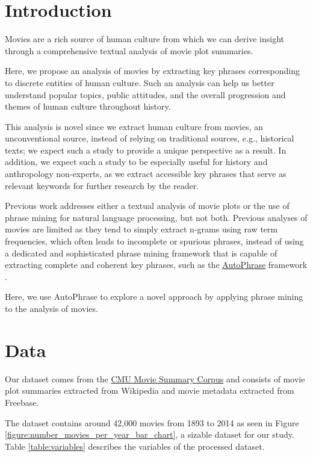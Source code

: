 \documentclass{article}
\begin{document}
\begin{multicols}{2}
\section{Introduction} %
Movies are a rich source of human culture from which we can derive insight through a comprehensive textual analysis of movie plot summaries.

Here, we propose an analysis of movies by extracting key phrases corresponding to discrete entities of human culture. Such an analysis can help us better understand popular topics, public attitudes, and the overall progression and themes of human culture throughout history.

This analysis is novel since we extract human culture from movies, an unconventional source, instead of relying on traditional sources, e.g., historical texts; we expect such a study to provide a unique perspective as a result. In addition, we expect such a study to be especially useful for history and anthropology non-experts, as we extract accessible key phrases that serve as relevant keywords for further research by the reader.

Previous work addresses either a textual analysis of movie plots or the use of phrase mining for natural language processing, but not both. Previous analyses of movies are limited as they tend to simply extract n-grams using raw term frequencies, which often leads to incomplete or spurious phrases, instead of using a dedicated and sophisticated phrase mining framework that is capable of extracting complete and coherent key phrases, such as the \href{https://github.com/shangjingbo1226/AutoPhrase}{AutoPhrase} framework \cite{Shang2018AutomatedPM}.

Here, we use AutoPhrase to explore a novel approach by applying phrase mining to the analysis of movies.

\section{Data}
Our dataset comes from the \href{http://www.cs.cmu.edu/~ark/personas/}{CMU Movie Summary Corpus} \cite{Bamman2013LearningLP} and consists of movie plot summaries extracted from Wikipedia and movie metadata extracted from Freebase.

The dataset contains around 42,000 movies from 1893 to 2014 as seen in Figure \ref{figure:number_movies_per_year_bar_chart}, a sizable dataset for our study. Table \ref{table:variables} describes the variables of the processed dataset.


\end{multicols}
\end{document}
